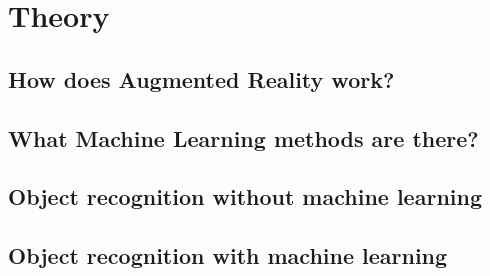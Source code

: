 \section{Theory}

\subsection{How does Augmented Reality work?}

\subsection{What Machine Learning methods are there?}

\subsection{Object recognition without machine learning}

\subsection{Object recognition with machine learning}

\newpage